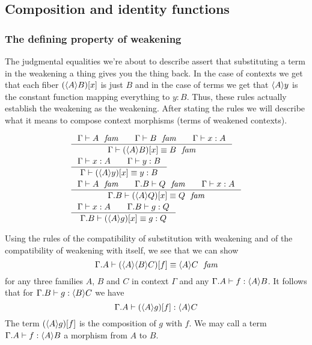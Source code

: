 \subsection{Composition and identity functions}
\subsubsection{The defining property of weakening}
The judgmental equalities we're about to describe assert that substituting a term
in the weakening a thing gives you the thing back. In the case of contexts we get that each fiber
$\subst{x}{\ctxwk{A}{B}}$ is just $B$ and in the case of terms we get 
that $\ctxwk{A}{y}$ is the constant function
mapping everything to $y:B$. Thus, these rules actually establish the weakening
as the weakening. After stating the rules we will describe what it means to
compose context morphisms (terms of weakened contexts).

\begin{align}
& \inference{\jfam{\Gamma}{A}\qquad\jfam{\Gamma}{B}\qquad\jterm{\Gamma}{A}{x}}{\jfameq{\Gamma}{\subst{x}{\ctxwk{A}{B}}}{B}}\\
& \inference{\jterm{\Gamma}{A}{x}\qquad\jterm{\Gamma}{B}{y}}{\jtermeq{\Gamma}{B}{\subst{x}{\ctxwk{A}{y}}}{y}}\\
& \inference{\jfam{\Gamma}{A}\qquad\jfam{\ctxext{\Gamma}{B}}{Q}\qquad\jterm{\Gamma}{A}{x}}{\jfameq{\ctxext{\Gamma}{B}}{\subst{x}{\ctxwk{A}{Q}}}{Q}}\\
& \inference{\jterm{\Gamma}{A}{x}\qquad\jterm{\ctxext{\Gamma}{B}}{Q}{g}}{\jtermeq{\ctxext{\Gamma}{B}}{Q}{\subst{x}{\ctxwk{A}{g}}}{g}}
\end{align}

Using the rules of the compatibility of substitution with weakening and of the
compatibility of weakening with itself, we see that we can show
\begin{equation*}
\jfameq{\ctxext{\Gamma}{A}}{\subst{f}{\ctxwk{A}{{B}{C}}}}{\ctxwk{A}{C}}
\end{equation*}
for any three families $A$, $B$ and $C$ in context $\Gamma$ and any $\jterm{\ctxext{\Gamma}{A}}{\ctxwk{A}{B}}{f}$.
It follows that for $\jterm{\ctxext{\Gamma}{B}}{\ctxwk{B}{C}}{g}$ we have
\begin{equation*}
\jterm{\ctxext{\Gamma}{A}}{\ctxwk{A}{C}}{\subst{f}{\ctxwk{A}{g}}}
\end{equation*}
The term $\jcomp{A}{f}{g}$ is the composition of $g$ with $f$. We may call
a term $\jterm{\ctxext{\Gamma}{A}}{\ctxwk{A}{B}}{f}$ a morphism from $A$ to $B$.

